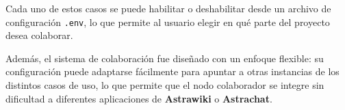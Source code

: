 Cada uno de estos casos se puede habilitar o deshabilitar desde un archivo de configuración \texttt{.env}, lo que permite al usuario elegir en qué parte del proyecto desea colaborar.

Además, el sistema de colaboración fue diseñado con un enfoque flexible: su configuración puede adaptarse fácilmente para apuntar a otras instancias de los distintos casos de uso, lo que permite que el nodo colaborador se integre sin dificultad a diferentes aplicaciones de \textbf{Astrawiki} o \textbf{Astrachat}.